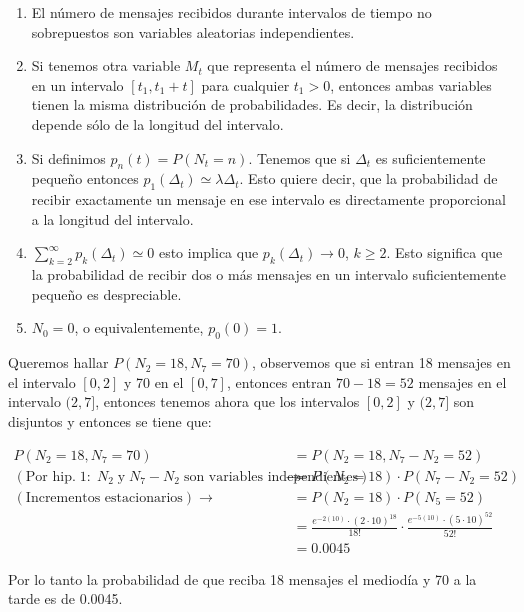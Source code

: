 \documentclass[11pt]{article}
\begin{document}
\begin{enumerate}
  \item El número de mensajes recibidos durante intervalos de tiempo
        no sobrepuestos son variables aleatorias independientes.
  \item Si tenemos otra variable $ M_t $ que representa el número de 
        mensajes recibidos en un intervalo $[t_1, t_1 + t]$ para cualquier
        $ t_1 > 0 $, entonces ambas variables tienen la misma distribución de
        probabilidades. Es decir, la distribución depende sólo de la longitud
        del intervalo.
  \item Si definimos $p_n(t) = P(N_t = n)$. Tenemos que si $\Delta_t$
        es suficientemente pequeño entonces $p_1(\Delta_t) \simeq \lambda \Delta_t$. 
        Esto quiere decir, que la probabilidad de recibir exactamente un mensaje en
        ese intervalo es directamente proporcional a la longitud del intervalo.
  \item $\displaystyle\sum_{k = 2}^{\infty} p_k(\Delta_t) \simeq 0 $ esto 
        implica que $ p_k(\Delta_t) \rightarrow 0 $, $k \geq 2$.
        Esto significa que la probabilidad de recibir dos o más
        mensajes en un intervalo suficientemente pequeño es despreciable.
  \item $ N_0 = 0 $, o equivalentemente, $ p_0(0) = 1 $.
\end{enumerate}

Queremos hallar $ P(N_2 = 18, N_7 = 70) $, observemos que si entran 18 mensajes en
el intervalo $[0, 2]$ y 70 en el $[0, 7]$, entonces entran $70 - 18 = 52$ mensajes en
el intervalo $(2, 7]$, entonces tenemos ahora que los intervalos $[0, 2] $ y $ (2, 7] $
son disjuntos y entonces se tiene que:

\begin{align*}
  P(N_2 = 18, N_7 = 70) &= P(N_2 = 18, N_7 - N_2 = 52) \\
  (\text{Por hip.} \; 1: \; N_2 \;\text{y}\; N_7 - N_2 \; \text{son variables independientes}) \rightarrow &= P(N_2 = 18) \cdot P(N_7 - N_2 = 52) \\
  (\text{Incrementos estacionarios}) \rightarrow &= P(N_2 = 18) \cdot P(N_5 = 52) \\
                        &= \frac{e^{-2(10)} \cdot (2 \cdot 10)^{18}}{18!} \cdot \frac{e^{-5(10)} \cdot (5 \cdot 10)^{52}}{52!} \\
                        &= 0.0045
\end{align*}

Por lo tanto la probabilidad de que reciba 18 mensajes el mediodía y 70 a la tarde es de 0.0045.
\end{document}
